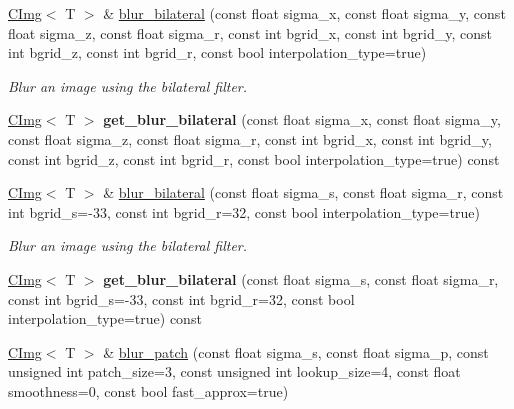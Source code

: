 \begin{DoxyCompactItemize}
\item 
\hyperlink{structcimg__library_1_1CImg}{CImg}$<$ T $>$ \& \hyperlink{structcimg__library_1_1CImg_a42321139d023b6603e197799d16b6ead}{blur\_\-bilateral} (const float sigma\_\-x, const float sigma\_\-y, const float sigma\_\-z, const float sigma\_\-r, const int bgrid\_\-x, const int bgrid\_\-y, const int bgrid\_\-z, const int bgrid\_\-r, const bool interpolation\_\-type=true)
\begin{DoxyCompactList}\small\item\em Blur an image using the bilateral filter. \item\end{DoxyCompactList}\item 
\hypertarget{structcimg__library_1_1CImg_a1133fe36e0af8ffeb5b9564660898fb4}{
\hyperlink{structcimg__library_1_1CImg}{CImg}$<$ T $>$ {\bfseries get\_\-blur\_\-bilateral} (const float sigma\_\-x, const float sigma\_\-y, const float sigma\_\-z, const float sigma\_\-r, const int bgrid\_\-x, const int bgrid\_\-y, const int bgrid\_\-z, const int bgrid\_\-r, const bool interpolation\_\-type=true) const }
\label{structcimg__library_1_1CImg_a1133fe36e0af8ffeb5b9564660898fb4}

\item 
\hypertarget{structcimg__library_1_1CImg_a2ef033809467273e98c94ddb6b8fe78d}{
\hyperlink{structcimg__library_1_1CImg}{CImg}$<$ T $>$ \& \hyperlink{structcimg__library_1_1CImg_a2ef033809467273e98c94ddb6b8fe78d}{blur\_\-bilateral} (const float sigma\_\-s, const float sigma\_\-r, const int bgrid\_\-s=-\/33, const int bgrid\_\-r=32, const bool interpolation\_\-type=true)}
\label{structcimg__library_1_1CImg_a2ef033809467273e98c94ddb6b8fe78d}

\begin{DoxyCompactList}\small\item\em Blur an image using the bilateral filter. \item\end{DoxyCompactList}\item 
\hypertarget{structcimg__library_1_1CImg_abdfb6ebf9e2125216defe8b29e8a90c9}{
\hyperlink{structcimg__library_1_1CImg}{CImg}$<$ T $>$ {\bfseries get\_\-blur\_\-bilateral} (const float sigma\_\-s, const float sigma\_\-r, const int bgrid\_\-s=-\/33, const int bgrid\_\-r=32, const bool interpolation\_\-type=true) const }
\label{structcimg__library_1_1CImg_abdfb6ebf9e2125216defe8b29e8a90c9}

\item 
\hypertarget{structcimg__library_1_1CImg_a1c5fb7b1254ed173c2539af3c3596672}{
\hyperlink{structcimg__library_1_1CImg}{CImg}$<$ T $>$ \& \hyperlink{structcimg__library_1_1CImg_a1c5fb7b1254ed173c2539af3c3596672}{blur\_\-patch} (const float sigma\_\-s, const float sigma\_\-p, const unsigned int patch\_\-size=3, const unsigned int lookup\_\-size=4, const float smoothness=0, const bool fast\_\-approx=true)}
\label{structcimg__library_1_1CImg_a1c5fb7b1254ed173c2539af3c3596672}


\end{DoxyCompactItemize}
